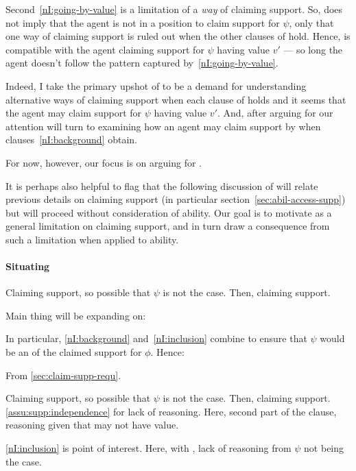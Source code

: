 \begin{note}
  Second~\ref{nI:going-by-value} is a limitation of a \emph{way} of claiming support.
  So, \nI{} does not imply that the agent is not in a position to claim support for \(\psi\), only that one way of claiming support is ruled out when the other clauses of \nI{} hold.
  Hence, \nI{} is compatible with the agent claiming support for \(\psi\) having value \(v'\) --- so long the agent doesn't follow the pattern captured by~\ref{nI:going-by-value}.

  Indeed, I take the primary upshot of \nI{} to be a demand for understanding alternative ways of claiming support when each clause of \nI{} holds and it seems that the agent may claim support for \(\psi\) having value \(v'\).
  And, after arguing for \nI{} our attention will turn to examining how an agent may claim support by \EAS{} when clauses~\ref{nI:background} obtain.

  For now, however, our focus is on arguing for \nI{}.

  It is perhaps also helpful to flag that the following discussion of \nI{} will relate previous details on claiming support (in particular section~\ref{sec:abil-access-supp}) but will proceed without consideration of ability.
  Our goal is to motivate \nI{} as a general limitation on claiming support, and in turn draw a consequence from such a limitation when applied to ability.
\end{note}


\paragraph{Situating \nI{}}

\begin{note}
  Claiming support, so possible that \(\psi\) is not the case.
  Then, claiming support.

  Main thing will be expanding on:

  \begin{quote}
    \vspace{-\baselineskip}
    \ideaEIS*
  \end{quote}

  In particular, \ref{nI:background} and~\ref{nI:inclusion} combine to ensure that \(\psi\) would be an \requ{} of the claimed support for \(\phi\).
  Hence:

  \begin{quote}
    \vspace{-\baselineskip}
    \assuCSRReq*
  \end{quote}

  From \autoref{sec:claim-supp-requ}.

  Claiming support, so possible that \(\psi\) is not the case.
  Then, claiming support.
  \autoref{assu:supp:independence} for lack of reasoning.
  Here, second part of the clause, reasoning given that \requ{} may not have value.

  \ref{nI:inclusion} is point of interest.
  Here, with \nI{}, lack of reasoning from \(\psi\) not being the case.
\end{note}


